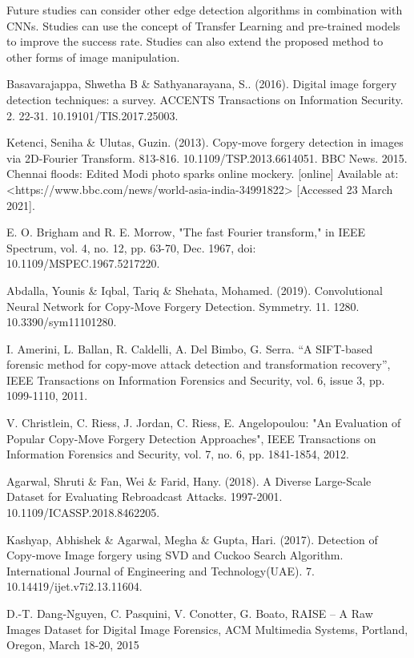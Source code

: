 \documentclass[conference]{IEEEtran}
\begin{document}
Future studies can consider other edge detection algorithms in combination with CNNs. Studies can use the concept of Transfer Learning and pre-trained models to improve the success rate. Studies can also extend the proposed method to other forms of image manipulation.


\begin{thebibliography}{00}
Basavarajappa, Shwetha B \& Sathyanarayana, S.. (2016). Digital image forgery detection techniques: a survey. ACCENTS Transactions on Information Security. 2. 22-31. 10.19101/TIS.2017.25003.

Ketenci, Seniha \& Ulutas, Guzin. (2013). Copy-move forgery detection in images via 2D-Fourier Transform. 813-816. 10.1109/TSP.2013.6614051. 
BBC News. 2015. Chennai floods: Edited Modi photo sparks online mockery. [online] Available at: <https://www.bbc.com/news/world-asia-india-34991822> [Accessed 23 March 2021].

E. O. Brigham and R. E. Morrow, "The fast Fourier transform," in IEEE Spectrum, vol. 4, no. 12, pp. 63-70, Dec. 1967, doi: 10.1109/MSPEC.1967.5217220.

Abdalla, Younis \& Iqbal, Tariq \& Shehata, Mohamed. (2019). Convolutional Neural Network for Copy-Move Forgery Detection. Symmetry. 11. 1280. 10.3390/sym11101280.

 I. Amerini, L. Ballan, R. Caldelli, A. Del Bimbo, G. Serra. 
“A SIFT-based forensic method for copy-move attack detection and transformation recovery”, IEEE Transactions on Information Forensics and Security, vol. 6, issue 3, pp. 1099-1110, 2011.

V. Christlein, C. Riess, J. Jordan, C. Riess, E. Angelopoulou: 
"An Evaluation of Popular Copy-Move Forgery Detection Approaches", 
IEEE Transactions on Information Forensics and Security, vol. 7, no. 6, pp. 1841-1854, 2012.

Agarwal, Shruti \& Fan, Wei \& Farid, Hany. (2018). A Diverse Large-Scale Dataset for Evaluating Rebroadcast Attacks. 1997-2001. 10.1109/ICASSP.2018.8462205.

Kashyap, Abhishek \& Agarwal, Megha \& Gupta, Hari. (2017). Detection of Copy-move Image forgery using SVD and Cuckoo Search Algorithm. International Journal of Engineering and Technology(UAE). 7. 10.14419/ijet.v7i2.13.11604. 

D.-T. Dang-Nguyen, C. Pasquini, V. Conotter, G. Boato, RAISE – A Raw Images Dataset for Digital Image Forensics, ACM Multimedia Systems, Portland, Oregon, March 18-20, 2015


\end{thebibliography}
\end{document}
